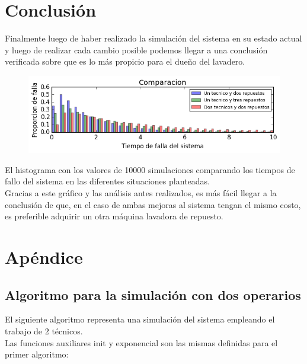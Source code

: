 \documentclass[10pt,a4paper]{article} %
\begin{document}
    \newpage
    \section{Conclusi\'on}
    Finalmente luego de haber realizado la simulaci\'on del sistema en su estado actual y luego de realizar cada cambio posible podemos llegar a una conclusi\'on verificada sobre que es lo m\'as propicio para el due\~no del lavadero. \\
    
    \begin {figure}[!htb]
    \centering
    \includegraphics[width=12cm] {img/comparisson}
    \end {figure}
    
    El histograma con los valores de 10000 simulaciones comparando los tiempos de fallo del sistema en las diferentes situaciones planteadas.\\ 
    Gracias a este gr\'afico y las an\'alisis antes realizados, es m\'as f\'acil llegar a la conclusi\'on de que, en el caso de ambas mejoras al sistema tengan el mismo costo, es preferible adquirir un otra m\'aquina lavadora de repuesto.

    \newpage
    \section{Ap\'endice}
    \subsection{Algoritmo para la simulaci\'on con dos operarios}
    El siguiente algoritmo representa una simulaci\'on del sistema empleando el trabajo de 2 t\'ecnicos.\\
    Las funciones auxiliares init y exponencial son las mismas definidas para el primer algoritmo:
\end{document}
